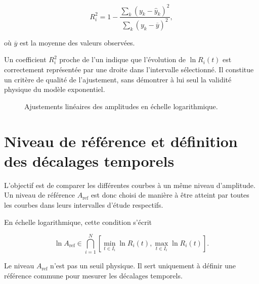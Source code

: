 \documentclass[
    11pt,
    a4paper
]{article}
\begin{document}
\begin{equation}
    R_i^2
    =
    1-
    \frac{
        \displaystyle\sum_k
        \left(y_k-\widehat{y}_k\right)^2
    }{
        \displaystyle\sum_k
        \left(y_k-\overline{y}\right)^2
    },
    \label{eq:r2}
\end{equation}

où \(\overline{y}\) est la moyenne des valeurs observées.

Un coefficient \(R_i^2\) proche de l'un indique que l'évolution de
\(\ln R_i(t)\) est correctement représentée par une droite dans l'intervalle
sélectionné. Il constitue un critère de qualité de l'ajustement, sans démontrer
à lui seul la validité physique du modèle exponentiel.

\begin{figure}[H]
    \centering
    \caption{Ajustements linéaires des amplitudes en échelle logarithmique.}
    \label{fig:fits-log}
\end{figure}



\section{Niveau de référence et définition des décalages temporels}
\label{sec:niveau-reference}

L'objectif est de comparer les différentes courbes à un même niveau
d'amplitude. Un niveau de référence \(A_{\mathrm{ref}}\) est donc choisi de
manière à être atteint par toutes les courbes dans leurs intervalles d'étude
respectifs.

En échelle logarithmique, cette condition s'écrit

\begin{equation}
    \ln A_{\mathrm{ref}}
    \in
    \bigcap_{i=1}^{N}
    \left[
        \min_{t\in I_i}\ln R_i(t),
        \max_{t\in I_i}\ln R_i(t)
    \right].
    \label{eq:condition-Aref}
\end{equation}

Le niveau \(A_{\mathrm{ref}}\) n'est pas un seuil physique. Il sert uniquement
à définir une référence commune pour mesurer les décalages temporels.
\end{document}
